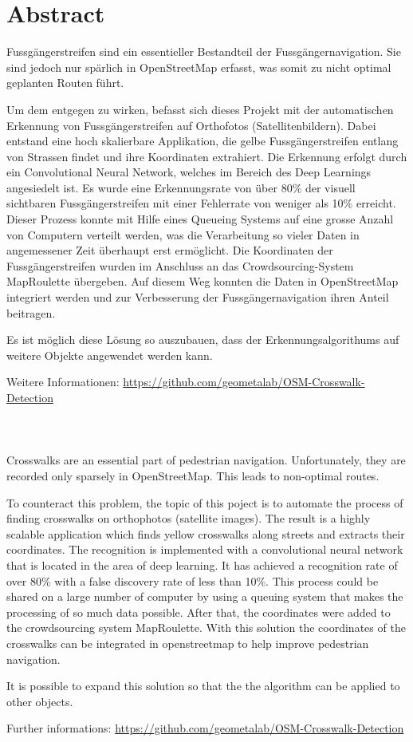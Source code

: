 \section{Abstract}

Fussgängerstreifen sind ein essentieller Bestandteil der Fussgängernavigation. Sie sind jedoch nur spärlich in OpenStreetMap erfasst, was somit zu nicht optimal geplanten Routen führt.

Um dem entgegen zu wirken,  befasst sich dieses Projekt mit der automatischen Erkennung von Fussgängerstreifen auf Orthofotos (Satellitenbildern). 
Dabei entstand eine hoch skalierbare Applikation, die gelbe Fussgängerstreifen entlang von Strassen findet und ihre Koordinaten extrahiert. Die Erkennung erfolgt durch ein Convolutional Neural Network, welches im Bereich des Deep Learnings angesiedelt ist.
Es wurde eine Erkennungsrate von über 80\% der visuell sichtbaren Fussgängerstreifen mit einer Fehlerrate von weniger als 10\% erreicht. Dieser Prozess konnte mit Hilfe eines Queueing Systems auf eine grosse Anzahl von Computern verteilt werden, was die Verarbeitung so vieler Daten in angemessener Zeit überhaupt erst ermöglicht. Die Koordinaten der Fussgängerstreifen wurden im Anschluss an das Crowdsourcing-System MapRoulette übergeben. Auf diesem Weg konnten die Daten in OpenStreetMap integriert werden und zur Verbesserung der Fussgängernavigation ihren Anteil beitragen.

Es ist möglich diese Lösung so auszubauen, dass der Erkennungsalgorithums auf weitere Objekte angewendet werden kann.

Weitere Informationen: \url{https://github.com/geometalab/OSM-Crosswalk-Detection}\\ \\ \\ \\




Crosswalks are an essential part of pedestrian navigation. Unfortunately, they are recorded only sparsely in OpenStreetMap. This leads to non-optimal routes.

To counteract this problem, the topic of this poject is to automate the process of finding crosswalks on orthophotos (satellite images). The result is a highly scalable application which finds yellow crosswalks along streets and extracts their coordinates. The recognition is implemented with a convolutional neural network that is located in the area of deep learning. It has achieved a recognition rate of over 80\% with a false discovery rate of less than 10\%. This process could be shared on a large number of computer by using a queuing system that makes the processing of so much data possible. After that, the coordinates were added to the crowdsourcing system MapRoulette. With this solution the coordinates of the crosswalks can be integrated in openstreetmap to help improve pedestrian navigation.

It is possible to expand this solution so that the the algorithm can be applied to other objects.

Further informations: \url{https://github.com/geometalab/OSM-Crosswalk-Detection}